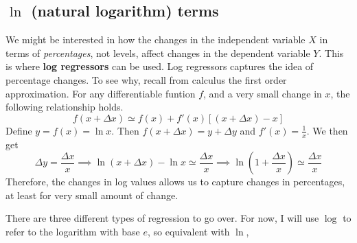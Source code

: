 \documentclass[12pt]{article}
\theoremstyle{definition}
\theoremstyle{property}
\theoremstyle{assumption}
\theoremstyle{example}
\theoremstyle{comment}
\begin{document}
\subsection{$\ln$ (natural logarithm) terms}
We might be interested in how the changes in the independent variable $X$ in terms of \textit{percentages}, not levels, affect changes in the dependent variable $Y$. This is where \textbf{log regressors} can be used. Log regressors captures the idea of percentage changes. To see why, recall from calculus the first order approximation. For any differentiable funtion $f$, and a very small change in $x$, the following relationship holds. 
\[
f(x+\Delta x) \simeq f(x)+f'(x)[(x+\Delta x) -x] 
\]
Define $y=f(x)=\ln{x}$. Then $f(x+\Delta x) = y+\Delta y$ and $f'(x)=\frac{1}{x}$. We then get 
\[
\Delta y = \frac{\Delta x}{x}\implies \ln{(x+\Delta x)}-\ln{x} \simeq \frac{\Delta x}{x} \implies \ln\left(1+\frac{\Delta x}{x}\right)\simeq\frac{\Delta x}{x}
\]
Therefore, the changes in log values allows us to capture changes in percentages, at least for very small amount of change. \par\medskip
There are three different types of regression to go over. For now, I will use $\log$ to refer to the logarithm with base $e$, so equivalent with $\ln$, 
\end{document}
